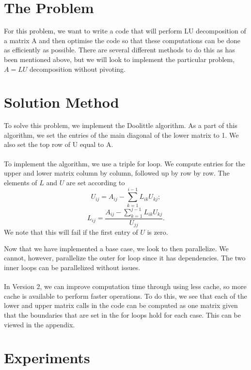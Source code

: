 \documentclass{article}
\begin{document}
\section{The Problem}
For this problem, we want to write a code that will perform LU decomposition of a matrix A and then optimise the code so that these computations can be done as efficiently as possible. There are several different methods to do this as has been mentioned above, but we will look to implement the particular problem, $A = LU$ decomposition without pivoting.
\section{Solution Method}
To solve this problem, we implement the Doolittle algorithm. As a part of this algorithm, we set the entries of the main diagonal of the lower matrix to 1. We also set the top row of U equal to A.
\\\\
To implement the algorithm, we use a triple for loop. We compute entries for the upper and lower matrix column by column, followed up by row by row. The elements of $L$ and $U$ are set according to
$$U_{ij} = A_{ij} - \sum_{k = 1}^{i - 1}L_{ik}U_{kj};$$
$$L_{ij} = \frac{A_{ij} - \sum_{k=1}^{j-1}L_{ik}U_{kj}}{U_{jj}}.$$
We note that this will fail if the first entry of $U$ is zero.

Now that we have implemented a base case, we look to then parallelize. We cannot, however, parallelize the outer for loop since it has dependencies. The two inner loops can be parallelized without issues.
\\\\
In Version 2, we can improve computation time through using less cache, so more cache is available to perform faster operations. To do this, we see that each of the lower and upper matrix calls in the code can be computed as one matrix given that the boundaries that are set in the for loops hold for each case. This can be viewed in the appendix.
\section{Experiments}
\end{document}
